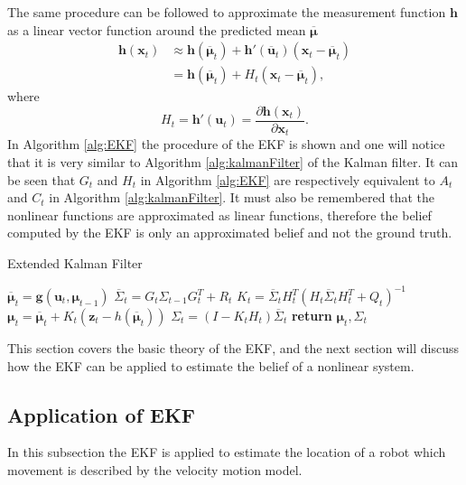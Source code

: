 \documentclass[12pt,oneside,openany,a4paper, %
afrikaans,english,
]{memoir}
\numberwithin{equation}{chapter}
\begin{document}
The same procedure can be followed to approximate the measurement function $\bm{h}$ as a linear vector function around the predicted mean $\overline{\bm{\mu}}$
\begin{equation}
\begin{split}
\bm{h}(\bm{x}_{t}) & \approx \bm{h}(\bm{\overline{\mu}}_{t}) + \bm{h}'(\bm{\overline{u}}_t)(\bm{x}_{t} - \bm{\overline{\mu}}_{t})\\
& = \bm{h}(\bm{\overline{\mu}}_t) + H_t(\bm{x}_{t} - 
\bm{\overline{\mu}}_{t}),
\end{split}  
\end{equation}
where
\begin{equation}\label{eq:Ht}
H_t = \bm{h}'(\bm{u}_t) = \frac{\partial \bm{h}(\bm{x}_{t})}{\partial \bm{x}_{t}}.
\end{equation}
In Algorithm \ref{alg:EKF} the procedure of the EKF is shown and one will notice that it is very similar to Algorithm \ref{alg:kalmanFilter} of the Kalman filter. It can be seen that $G_t$ and $H_t$ in Algorithm \ref{alg:EKF} are respectively equivalent to $A_t$ and $C_t$ in Algorithm \ref{alg:kalmanFilter}. It must also be remembered that the nonlinear functions are approximated as linear functions, therefore the belief computed by the EKF is only an approximated belief and not the ground truth.

\begin{algorithm}
\caption{Extended Kalman Filter}\label{alg:EKF}
\begin{algorithmic}[1]
\State $\overline{\bm{\mu}}_t = \bm{g}(\bm{u}_t, \bm{\mu}_{t-1})$
\State $\overline{\Sigma}_t = G_t \Sigma_{t-1} G_t^T + R_t$
\State $K_t = \overline{\Sigma}_t H_t^T(H_t\overline{\Sigma}_t H_t^T + Q_t)^{-1}$
\State $\bm{\mu}_t = \overline{\bm{\mu}}_t + K_t(\bm{z}_t - h(\overline{\bm{\mu}}_t))$
\State $\Sigma_t = (I - K_tH_t)\overline{\Sigma}_t$
\State \textbf{return} $\bm{\mu}_t, \Sigma_t$
\EndProcedure
\end{algorithmic}
\end{algorithm}
This section covers the basic theory of the EKF, and the next section will discuss how the EKF can be applied to estimate the belief of a nonlinear system.
\subsection{Application of EKF}
In this subsection the EKF is applied to estimate the location of a robot which movement is described by the velocity motion model.
\end{document}
